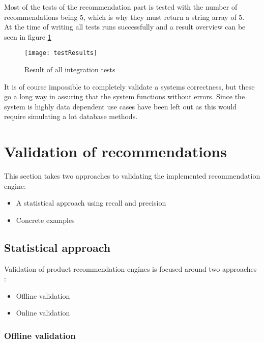 Most of the tests of the recommendation part is tested with the number of recommendations being 5, which is why they must return a string array of 5. \\
At the time of writing all tests runs successfully and a result overview can be seen in figure \ref{testResult}
\begin{figure}[H]
\centering
\texttt{[image: testResults]}
\caption{Result of all integration tests}
\label{testResult}
\end{figure}

It is of course impossible to completely validate a systems correctness, but these go a long way in assuring that the system functions without errors.
Since the system is highly data dependent use cases have been left out as this would require simulating a lot database methods.

\section{Validation of recommendations}

This section takes two approaches to validating the implemented recommendation engine:
\begin{itemize}
\item A statistical approach using recall and precision
\item Concrete examples
\end{itemize}

\subsection{Statistical approach}

Validation of product recommendation engines is focused around two approaches \cite{eval}:
\begin{itemize}
\item Offline validation
\item Online validation
\end{itemize}

\subsubsection{Offline validation}

